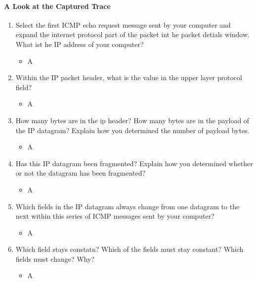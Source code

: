 \documentclass{article}
\begin{document}
\paragraph{A Look at the Captured Trace}
  \begin{enumerate}
    \item Select the first ICMP echo request message sent by your computer and expand the internet protocol part of the packet int he packet detials window.  What ist he IP address of your computer?
            \begin{itemize}
            \item A
          \end{itemize}

      \item Within the IP packet header, what is the value in the upper layer protocol field?
          \begin{itemize}
            \item A
          \end{itemize}

      \item How many bytes are in the ip header?  How many bytes are in the payload of the IP datagram?  Explain how you determined the number of payload bytes.
          \begin{itemize}
            \item A
          \end{itemize}

      \item Has this IP datagram been fragmented?  Explain how you determined whether or not the datagram has been fragmented?
          \begin{itemize}
            \item A
          \end{itemize}

      \item Which fields in the IP datagram always change from one datagram to the next within this series of ICMP messages sent by your computer?
          \begin{itemize}
            \item A
          \end{itemize}

      \item Which field stays constatn?  Which of the fields must stay constant?  Which fields must change? Why?
          \begin{itemize}
            \item A
          \end{itemize}


\end{enumerate}
\end{document}
